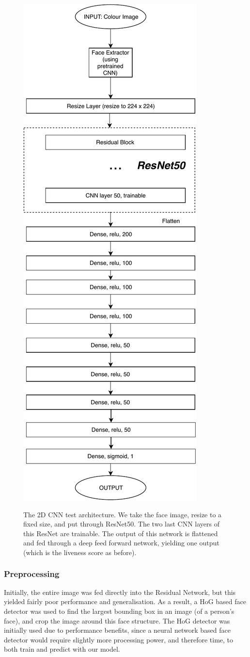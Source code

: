 \documentclass[10pt,a4paper]{article}
\begin{document}
        \begin{figure}
            \centering
            \includegraphics[width=0.5\linewidth]{2DCNNArchitecture.pdf}
            \label{2DCNNArchitecture}
            \caption{The 2D CNN test architecture. We take the face image, resize to a fixed size, and put through ResNet50. The two last CNN layers
            of this ResNet are trainable. The output of this network is flattened and fed through a deep feed forward network, yielding one output (which is the
            liveness score as before).}
        \end{figure}

        
        \subsubsection{Preprocessing}
            Initially, the entire image was fed directly into the Residual Network, but this yielded fairly poor performance and generalisation. As a result,
            a HoG based face detector was used to find the largest bounding box in an image (of a person's face), and crop the image around this face structure. The HoG detector was
            initially used due to performance benefits, since a neural network based face detector would require slightly more processing power, and therefore time, to both train and
            predict with our model.
\end{document}
